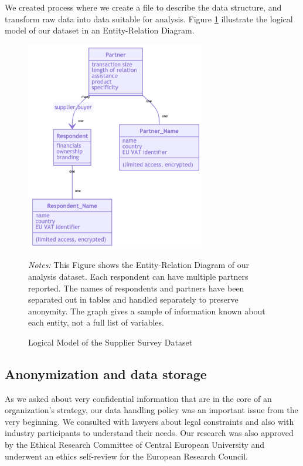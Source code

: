 \documentclass[final, dvipsnames, authoryear,12pt]{elsarticle}
\begin{document}
We created process where we create a file to describe the data structure, and transform raw data into data suitable for analysis. Figure \ref{fig:ERD} illustrate the logical model of our dataset in an Entity-Relation Diagram.

\begin{figure}[!h]
    \caption{Logical Model of the Supplier Survey Dataset}
    \label{fig:ERD} 
    \begin{center}    
    \includegraphics[width=0.7\textwidth]{graphs/ERD.png}
     \end{center}    
        {\footnotesize \textit{Notes:} This Figure shows the Entity-Relation Diagram of our analysis dataset. Each respondent can have multiple partners reported. The names of respondents and partners have been separated out in tables and handled separately to preserve anonymity. The graph gives a sample of information known about each entity, not a full list of variables.} 
\end{figure}

\subsection{Anonymization and data storage} 
As we asked about very confidential information that are in the core of an organization’s strategy, our data handling policy was an important issue from the very beginning. We consulted with lawyers about legal constraints and also with industry participants to understand their needs. Our research was also approved by the Ethical Research Committee of Central European University and underwent an ethics self-review for the European Research Council.
\end{document}

